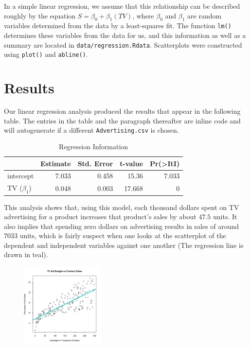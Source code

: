 \documentclass{article}
\begin{document}
In a simple linear regression, we assume that this relationship can be described roughly by the equation $S = \beta_0+\beta_1(TV)$, where $\beta_0$ and $\beta_1$ are random variables determined from the data by a least-squares fit. The function \texttt{lm()} determines these variables from the data for us, and this information as well as a summary are located in \texttt{data/regression.Rdata}.  Scatterplots were constructed using \texttt{plot()} and \texttt{abline()}.

\section{Results}

Our linear regression analysis produced the results that appear in the following table. The entries in the table and the paragraph thereafter are inline code and will autogenerate if a different \texttt{Advertising.csv} is chosen. \\

\begin{table}[ht]
\centering
\begin{tabular}{|l|r|r|r|r|}
 & Estimate & Std. Error & t-value & Pr(>ItI) \\ \hline
intercept & 7.033 & 0.458 & 15.36 & 7.033 \\
TV ($\beta_1$) & 0.048 & 0.003 & 17.668 & 0\\
\end{tabular}
\caption{Regression Information}
\end{table}

This analysis shows that, using this model, each thousand dollars spent on TV advertising for a product increases that product's sales by about $47.5$ units.  It also implies that spending zero dollars on advertising results in sales of around $7033$ units, which is fairly suspect when one looks at the scatterplot of the dependent and independent variables against one another (The regression line is drawn in teal).

\begin{figure}[!ht]
\centering
\includegraphics[width=160px]{../images/scatterplot-tv-sales.png}
\label{fig:scatterplot}
\end{figure}
\end{document}
